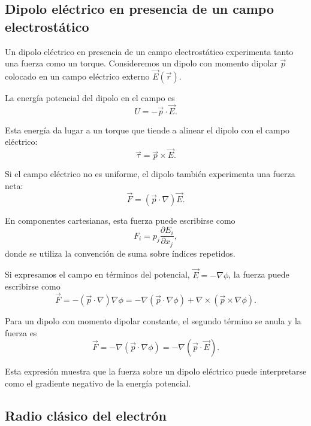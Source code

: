 \documentclass[12pt,a4paper]{book}
\begin{document}
\subsection{Dipolo eléctrico en presencia de un campo electrostático}

Un dipolo eléctrico en presencia de un campo electrostático experimenta tanto una fuerza como un torque. Consideremos un dipolo con momento dipolar $\vec{p}$ colocado en un campo eléctrico externo $\vec{E}(\vec{r})$.

La energía potencial del dipolo en el campo es
\begin{equation}
U = -\vec{p} \cdot \vec{E}.
\end{equation}

Esta energía da lugar a un torque que tiende a alinear el dipolo con el campo eléctrico:
\begin{equation}
\vec{\tau} = \vec{p} \times \vec{E}.
\end{equation}

Si el campo eléctrico no es uniforme, el dipolo también experimenta una fuerza neta:
\begin{equation}
\vec{F} = (\vec{p} \cdot \nabla)\vec{E}.
\end{equation}

En componentes cartesianas, esta fuerza puede escribirse como
\begin{equation}
F_i = p_j \frac{\partial E_i}{\partial x_j},
\end{equation}
donde se utiliza la convención de suma sobre índices repetidos.

Si expresamos el campo en términos del potencial, $\vec{E} = -\nabla \phi$, la fuerza puede escribirse como
\begin{equation}
\vec{F} = -(\vec{p} \cdot \nabla)\nabla \phi = -\nabla(\vec{p} \cdot \nabla \phi) + \nabla \times (\vec{p} \times \nabla \phi).
\end{equation}

Para un dipolo con momento dipolar constante, el segundo término se anula y la fuerza es
\begin{equation}
\vec{F} = -\nabla(\vec{p} \cdot \nabla \phi) = -\nabla(\vec{p} \cdot \vec{E}).
\end{equation}

Esta expresión muestra que la fuerza sobre un dipolo eléctrico puede interpretarse como el gradiente negativo de la energía potencial.

\subsection{Radio clásico del electrón}
\end{document}

